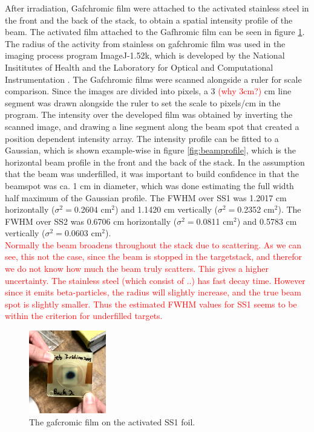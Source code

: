After irradiation, Gafchromic film were attached to the activated stainless steel in the front and the back of the stack, to obtain a spatial intensity profile of the beam. The activated film attached to the Gafhromic film can be seen in figure \ref{fig:SS1_gafchromic}. The radius of the activity from stainless on gafchromic film was used in the imaging process program ImageJ-1.52k, which is developed by the National Insititutes of Health and the Laboratory for Optical and Computational Instrumentation \cite{Rasband2010}. The Gafchromic films were scanned alongside a ruler for scale comparison. Since the images are divided into pixels, a 3 \textcolor{red}{(why 3cm?)} cm line segment was drawn alongside the ruler to set the scale to pixels/cm in the program. The intensity over the developed film was obtained by inverting the scanned image, and drawing a line segment along the beam spot that created a position dependent intensity array. The intensity profile can be fitted to a Gaussian, which is shown example-wise in figure \ref{fig:beamprofile}, which is the horizontal beam profile in the front and the back of the stack. In the assumption that the beam was underfilled, it was important to build confidence in that the beamspot was ca. 1 cm in diameter, which was done estimating the full width half maximum of the Gaussian profile. The FWHM over SS1 was 1.2017 cm horizontally ($\sigma^2=$0.2604 cm$^2$) and 1.1420 cm vertically ($\sigma^2=$0.2352 cm$^2$). The FWHM over SS2 was 0.6706 cm horizontally ($\sigma^2=$0.0811 cm$^2$) and 0.5783 cm vertically ($\sigma^2=$0.0603 cm$^2$). \\

\textcolor{red}{Normally the beam broadens throughout the stack due to scattering. As we can see, this not the case, since the beam is stopped in the targetstack, and therefor we do not know how much the beam truly scatters. This gives a higher uncertainty.  
The stainless steel (which consist of ..) has fast decay time. However since it emits beta-particles, the radius will slightly increase, and the true beam spot is slightly smaller. Thus the estimated FWHM values for SS1  seems to be within the criterion for underfilled targets. }



\begin{figure}
    \centering
    \includegraphics[width=0.3\textwidth]{Experiment/gafchromic_beamprofile.jpg}
    \caption{The gafcromic film on the activated SS1 foil. }
    \label{fig:SS1_gafchromic}
\end{figure}

